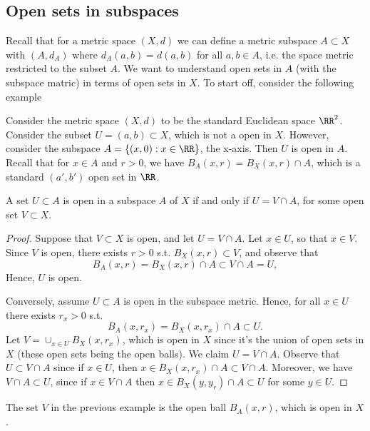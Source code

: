 \subsection{Open sets in subspaces}
Recall that for a metric space $(X,d)$ we can define a metric subspace $A\subset
X$ with $(A,d_A)$ where $d_A(a,b)=d(a,b)$ for all $a,b\in A$, i.e. the space
metric restricted to the subset $A$. We want to understand open sets in $A$
(with the subspace matric) in terms of open sets in $X$. To start off, consider
the following example
\begin{example}
  Consider the metric space $(X,d)$ to be the standard Euclidean space $\RR^2$.
  Consider the subset $U=(a,b)\subset X$, which is not a open in $X$. However,
  consider the subspace $A=\{(x,0): x\in\RR\}$, the x-axis. Then $U$ is open in
  $A$. Recall that for $x\in A$ and $r>0$, we have $B_A(x,r)=B_X(x,r)\cap A$,
  which is a standard $(a',b')$ open set in $\RR$.
\end{example}

\begin{proposition}
  A set $U\subset A$ is open in a subspace $A$ of $X$ if and only if $U=V\cap
  A$, for some open set $V\subset X$.
  \label{<+label+>}
\end{proposition}
\begin{proof}
  Suppose that $V\subset X$ is open, and let $U=V\cap A$. Let $x\in U$, so that
  $x\in V$. Since $V$ is open, there exists $r>0$ s.t. $B_X(x,r)\subset V$, and
  observe that 
  \[B_A(x,r)=B_X(x,r)\cap A \subset V\cap A = U,\]
  Hence, $U$ is open. 
  
  Conversely, assume $U\subset A$ is open in the subspace metric. Hence, for all
  $x\in U$ there exists $r_x>0$ s.t.
  \[B_A(x,r_x)=B_X(x,r_x)\cap A \subset U.\]
  Let $V=\cup_{x\in U} B_X(x,r_x)$, which is open in $X$ since it's the union of
  open sets in $X$ (these open sets being the open balls). We claim $U=V\cap A$.
  Observe that $U\subset V\cap A$ since if $x\in U$, then $x\in B_X(x,r_x)\cap
  A\subset V\cap A$. Moreover, we have $V\cap A\subset U$, since if $x\in V\cap
  A$ then $x\in B_X(y,y_r)\cap A \subset U$ for some $y\in U$.
\end{proof}
\begin{remark}
  The set $V$ in the previous example is the open ball $B_A(x,r)$, which is open
  in $X$.
\end{remark}


